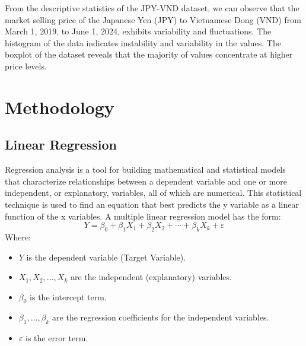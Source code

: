 \documentclass{ieeeojies}
\begin{document}
\justify
From the descriptive statistics of the JPY-VND dataset, we can observe that the market selling price of the Japanese Yen (JPY) to Vietnamese Dong (VND) from March 1, 2019, to June 1, 2024, exhibits variability and fluctuations. The histogram of the data indicates instability and variability in the values. The boxplot of the dataset reveals that the majority of values concentrate at higher price levels.

\section{Methodology}
\subsection{Linear Regression}
Regression analysis is a tool for building mathematical and statistical models that characterize relationships between a dependent variable and one or more independent, or explanatory, variables, all of which are numerical. This statistical technique is used to find an equation that best predicts the y variable as a linear function of the x variables.
A multiple linear regression model has the form: 
\[Y=\beta_0+\beta_1X_1+\beta_2X_2+\cdots+\beta_kX_k+\varepsilon\]
Where:
\begin{itemize}
	\item $Y$ is the dependent variable (Target Variable).
	\item $X_1, X_2, \ldots, X_k$ are the independent (explanatory) variables.
	\item $\beta_0$ is the intercept term.
	\item $\beta_1,..., \beta_k$ are the regression coefficients for the independent variables.
	\item $\varepsilon$ is the error term.
 \end{itemize}
\end{document}
